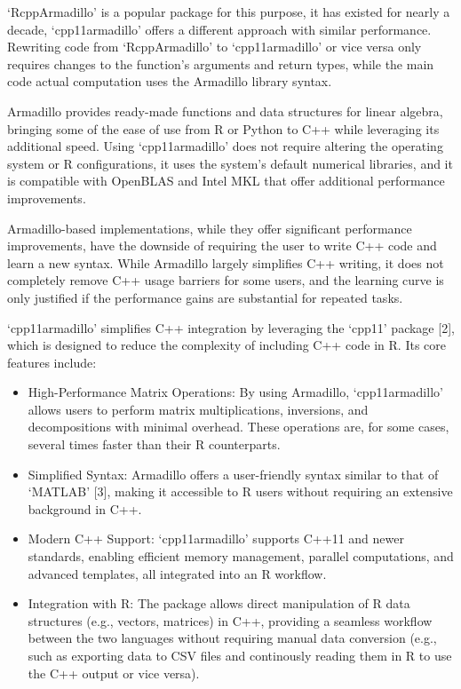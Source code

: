 \documentclass[preprint,12pt, a4paper]{elsarticle}
\begin{document}
`RcppArmadillo' is a popular package for this purpose, it has existed
for nearly a decade, `cpp11armadillo' offers a different approach with
similar performance. Rewriting code from `RcppArmadillo' to
`cpp11armadillo' or vice versa only requires changes to the function's
arguments and return types, while the main code actual computation uses
the Armadillo library syntax.

Armadillo provides ready-made functions and data structures for linear
algebra, bringing some of the ease of use from R or Python to C++ while
leveraging its additional speed. Using `cpp11armadillo' does not require
altering the operating system or R configurations, it uses the system's
default numerical libraries, and it is compatible with OpenBLAS and
Intel MKL that offer additional performance improvements.

Armadillo-based implementations, while they offer significant
performance improvements, have the downside of requiring the user to
write C++ code and learn a new syntax. While Armadillo largely
simplifies C++ writing, it does not completely remove C++ usage barriers
for some users, and the learning curve is only justified if the
performance gains are substantial for repeated tasks.

`cpp11armadillo' simplifies C++ integration by leveraging the `cpp11'
package {[}2{]}, which is designed to reduce the complexity of including
C++ code in R. Its core features include:

\begin{itemize}
\item
  High-Performance Matrix Operations: By using Armadillo,
  `cpp11armadillo' allows users to perform matrix multiplications,
  inversions, and decompositions with minimal overhead. These operations
  are, for some cases, several times faster than their R counterparts.
\item
  Simplified Syntax: Armadillo offers a user-friendly syntax similar to
  that of `MATLAB' {[}3{]}, making it accessible to R users without
  requiring an extensive background in C++.
\item
  Modern C++ Support: `cpp11armadillo' supports C++11 and newer
  standards, enabling efficient memory management, parallel
  computations, and advanced templates, all integrated into an R
  workflow.
\item
  Integration with R: The package allows direct manipulation of R data
  structures (e.g., vectors, matrices) in C++, providing a seamless
  workflow between the two languages without requiring manual data
  conversion (e.g., such as exporting data to CSV files and continously
  reading them in R to use the C++ output or vice versa).
\end{itemize}
\end{document}
